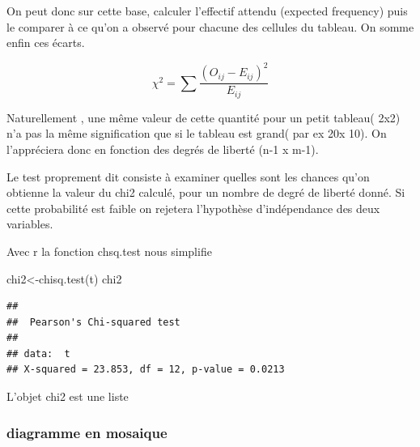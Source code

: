 \documentclass[
]{book}
\newenvironment{Shaded}{\begin{snugshade}}{\end{snugshade}}
\newcommand{\CommentTok}[1]{\textcolor[rgb]{0.56,0.35,0.01}{\textit{#1}}}
\newcommand{\DecValTok}[1]{\textcolor[rgb]{0.00,0.00,0.81}{#1}}
\newcommand{\FunctionTok}[1]{\textcolor[rgb]{0.00,0.00,0.00}{#1}}
\newcommand{\NormalTok}[1]{#1}
\newcommand{\OtherTok}[1]{\textcolor[rgb]{0.56,0.35,0.01}{#1}}
\newcommand{\SpecialCharTok}[1]{\textcolor[rgb]{0.00,0.00,0.00}{#1}}
\begin{document}
On peut donc sur cette base, calculer l'effectif attendu (expected frequency) puis le comparer à ce qu'on a observé pour chacune des cellules du tableau. On somme enfin ces écarts.

\[\chi^2 = \sum \frac {(O_{ij} - E_{ij})^2}{E_{ij}}\]

Naturellement , une même valeur de cette quantité pour un petit tableau( 2x2) n'a pas la même signification que si le tableau est grand( par ex 20x 10). On l'appréciera donc en fonction des degrés de liberté (n-1 x m-1).

Le test proprement dit consiste à examiner quelles sont les chances qu'on obtienne la valeur du chi2 calculé, pour un nombre de degré de liberté donné. Si cette probabilité est faible on rejetera l'hypothèse d'indépendance des deux variables.

Avec r la fonction chsq.test nous simplifie

\begin{Shaded}
\begin{Highlighting}[]
\NormalTok{chi2}\OtherTok{\textless{}{-}}\FunctionTok{chisq.test}\NormalTok{(t)}
\NormalTok{chi2}
\end{Highlighting}
\end{Shaded}

\begin{verbatim}
## 
##  Pearson's Chi-squared test
## 
## data:  t
## X-squared = 23.853, df = 12, p-value = 0.0213
\end{verbatim}

L'objet chi2 est une liste

\begin{Shaded}
\end{Shaded}

\hypertarget{diagramme-en-mosaique}{%
\subsubsection{diagramme en mosaique}\label{diagramme-en-mosaique}}
\end{document}
